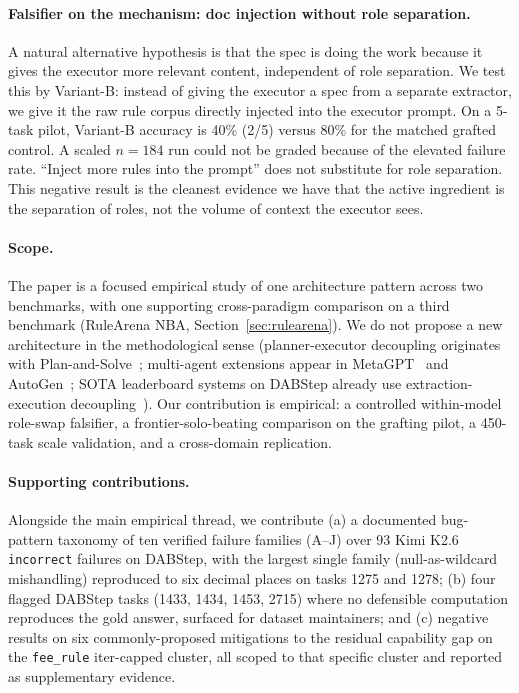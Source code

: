 \documentclass[conference]{IEEEtran}
\newcommand{\Kimi}{Kimi K2.6}
\begin{document}
\paragraph{Falsifier on the mechanism: doc injection without role separation.}
A natural alternative hypothesis is that the spec is doing the work because it gives the executor more relevant content, independent of role separation. We test this by Variant-B: instead of giving the executor a spec from a separate extractor, we give it the raw rule corpus directly injected into the executor prompt. On a 5-task pilot, Variant-B accuracy is 40\% (2/5) versus 80\% for the matched grafted control. A scaled $n=184$ run could not be graded because of the elevated failure rate. ``Inject more rules into the prompt'' does not substitute for role separation. This negative result is the cleanest evidence we have that the active ingredient is the separation of roles, not the volume of context the executor sees.

\paragraph{Scope.} The paper is a focused empirical study of one architecture pattern across two benchmarks, with one supporting cross-paradigm comparison on a third benchmark (RuleArena NBA, Section~\ref{sec:rulearena}). We do not propose a new architecture in the methodological sense (planner-executor decoupling originates with Plan-and-Solve~\cite{planAndSolve2023}; multi-agent extensions appear in MetaGPT~\cite{metagpt2023} and AutoGen~\cite{autogen2023}; SOTA leaderboard systems on DABStep already use extraction-execution decoupling~\cite{dsStar2025, nemoKgmon2025, oceanbaseDataPilot2025}). Our contribution is empirical: a controlled within-model role-swap falsifier, a frontier-solo-beating comparison on the grafting pilot, a 450-task scale validation, and a cross-domain replication.

\paragraph{Supporting contributions.}
Alongside the main empirical thread, we contribute (a) a documented bug-pattern taxonomy of ten verified failure families (A--J) over 93 \Kimi{} \texttt{incorrect} failures on DABStep, with the largest single family (null-as-wildcard mishandling) reproduced to six decimal places on tasks 1275 and 1278; (b) four flagged DABStep tasks (1433, 1434, 1453, 2715) where no defensible computation reproduces the gold answer, surfaced for dataset maintainers; and (c) negative results on six commonly-proposed mitigations to the residual capability gap on the \texttt{fee\_rule} iter-capped cluster, all scoped to that specific cluster and reported as supplementary evidence.
\end{document}
